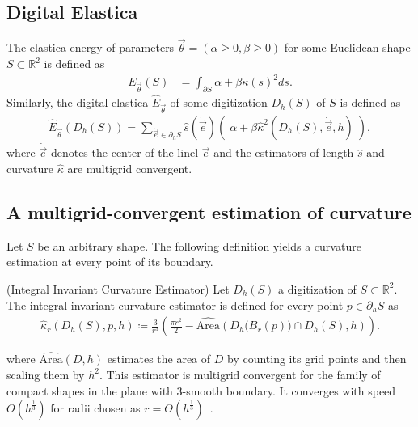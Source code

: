 \documentclass[runningheads]{llncs}
\begin{document}
\subsection{Digital Elastica}
The elastica energy of parameters $\vec{\theta}=(\alpha \geq 0, \beta \geq 0)$ for some Euclidean shape
$S \subset \mathbb{R}^2$ is defined as
	\begin{align*}
	E_{\vec{\theta}}(S) &= \int_{\partial S}{ \alpha + \beta \kappa(s)^2 ds}.
	\end{align*}
Similarly, the digital elastica $\hat{E}_{\vec{\theta}}$ of some digitization $D_h(S)$ of $S$ is defined as
	\begin{align}
	\hat{E}_{\vec{\theta}}( D_h(S) ) = \sum_{\dot{\vec{e}} \in \partial_h S}{ \hat{s}( \dot{\vec{e}})\left(\; \alpha + \beta \hat{\kappa}^2(D_h(S),\dot{\vec{e}},h) \; \right)},
	\label{ch5:digital-elastica}
	\end{align}
where $\dot{\vec{e}}$ denotes the center of the linel $\vec{e}$ and the estimators of length $\hat{s}$ and
curvature $\hat{\kappa}$ are multigrid convergent.


\subsection{A multigrid-convergent estimation of curvature}    
Let $S$ be an arbitrary shape. The following definition yields a curvature estimation at every point of its boundary.

\begin{definition}{(Integral Invariant Curvature Estimator)}
  Let $D_h(S)$ a digitization of $S \subset \mathbb{R}^2$. The integral invariant curvature estimator is defined for
  every point $p \in \partial_h S$ as
  \begin{align}
    \hat{\kappa}_{r}(D_h(S),p,h) \coloneqq \frac{3}{r^3} \left( \frac{\pi r^2}{2} - \widehat{\text{Area}} \left( D_h\big( B_{r} ( p ) \big) \cap D_h(S), h \right) \right).
    \label{eq:curvature_approximation}
  \end{align}
\end{definition}
%
where $\widehat{\text{Area}}( D,h )$ estimates the area of $D$ by counting its grid points and then scaling them by
$h^2$. This estimator is multigrid convergent for the family of compact shapes in the plane with $3$-smooth boundary. It
converges with speed $O(h^\frac{1}{3})$ for radii chosen as $r=\Theta(h^\frac{1}{3})$~\cite{lachaud17robust}.
\end{document}
